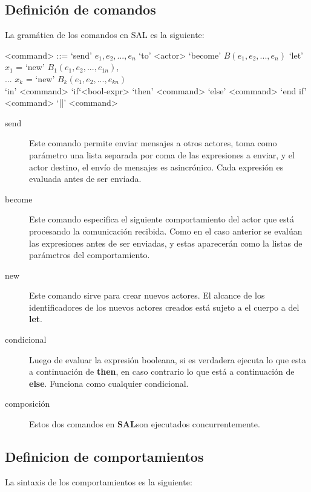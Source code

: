 \documentclass[fleqn]{article}
\newcommand{\SAL}{\textbf{SAL}}
\begin{document}
\subsection{Definición de comandos}
La gramática de los comandos en SAL es la siguiente:

\begin{grammar}
  <command> ::= `send' $e_1, e_2, ..., e_n$ `to' <actor>  
  \alt `become' $B(e_1, e_2, ..., e_n)$
  \alt `let' $x_1$ = `new' $B_1(e_1, e_2, ..., e_{1n})$, \\
   ... $x_k$ = `new' $B_k(e_1, e_2, ..., e_{kn})$       \\
  `in' <command> 
  \alt `if`<bool-expr> `then' <command> `else' <command> `end if'
  \alt <command> `||' <command>
\end{grammar}

\begin{description}
\item [send]  Este comando permite enviar mensajes a otros actores, toma como
  parámetro una lista separada por coma de las expresiones a enviar, y el actor
  destino, el envío de mensajes es asincrónico. Cada expresión es evaluada antes
  de ser enviada.
\item [become] Este comando especifica el siguiente comportamiento del actor
  que está procesando la comunicación recibida. Como en el caso anterior se evalúan
  las expresiones antes de ser enviadas, y estas aparecerán como la listas de
  parámetros del comportamiento. 
\item[new] Este comando sirve para crear nuevos actores. El alcance de los
  identificadores de los nuevos actores creados está sujeto a el cuerpo a del \textbf{let}.
\item[condicional] Luego de evaluar la expresión booleana, si es verdadera
  ejecuta lo que esta a continuación de \textbf{then}, en caso contrario lo que está a
  continuación de \textbf{else}. Funciona como cualquier condicional.
\item[composición] Estos dos comandos en \SAL son ejecutados concurrentemente.
  
\end{description}

\subsection{Definicion de comportamientos}

La sintaxis de los comportamientos es la siguiente:
\end{document}

